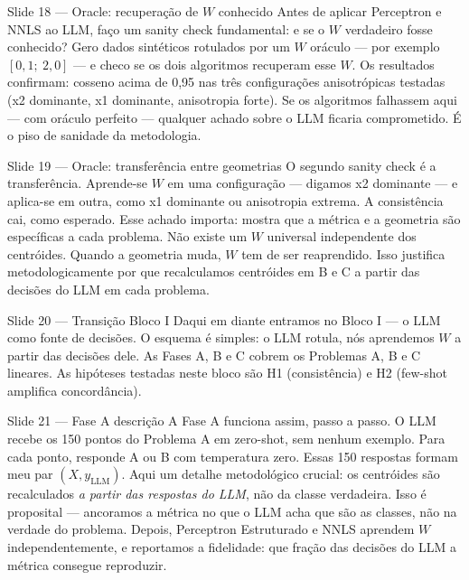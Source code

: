 \documentclass[aspectratio=169,10pt]{beamer}
\begin{document}
\begin{frame}{Slide 18 --- Oracle: recupera\c{c}\~ao de $W$ conhecido}
\footnotesize
Antes de aplicar Perceptron e NNLS ao LLM, fa\c{c}o um sanity check fundamental: e se o $W$ verdadeiro fosse conhecido? Gero dados sint\'eticos rotulados por um $W$ or\'aculo --- por exemplo $[0{,}1;\ 2{,}0]$ --- e checo se os dois algoritmos recuperam esse $W$. Os resultados confirmam: cosseno acima de 0,95 nas tr\^es configura\c{c}\~oes anisotr\'opicas testadas (x2 dominante, x1 dominante, anisotropia forte). Se os algoritmos falhassem aqui --- com or\'aculo perfeito --- qualquer achado sobre o LLM ficaria comprometido. \'E o piso de sanidade da metodologia.
\end{frame}

\begin{frame}{Slide 19 --- Oracle: transfer\^encia entre geometrias}
\footnotesize
O segundo sanity check \'e a transfer\^encia. Aprende-se $W$ em uma configura\c{c}\~ao --- digamos x2 dominante --- e aplica-se em outra, como x1 dominante ou anisotropia extrema. A consist\^encia cai, como esperado. Esse achado importa: mostra que a m\'etrica e a geometria s\~ao espec\'ificas a cada problema. N\~ao existe um $W$ universal independente dos centr\'oides. Quando a geometria muda, $W$ tem de ser reaprendido. Isso justifica metodologicamente por que recalculamos centr\'oides em B e C a partir das decis\~oes do LLM em cada problema.
\end{frame}

\begin{frame}{Slide 20 --- Transi\c{c}\~ao Bloco I}
\footnotesize
Daqui em diante entramos no Bloco I --- o LLM como fonte de decis\~oes. O esquema \'e simples: o LLM rotula, n\'os aprendemos $W$ a partir das decis\~oes dele. As Fases A, B e C cobrem os Problemas A, B e C lineares. As hip\'oteses testadas neste bloco s\~ao H1 (consist\^encia) e H2 (few-shot amplifica concord\^ancia).
\end{frame}

\begin{frame}{Slide 21 --- Fase A descri\c{c}\~ao}
\footnotesize
A Fase A funciona assim, passo a passo. O LLM recebe os 150 pontos do Problema A em zero-shot, sem nenhum exemplo. Para cada ponto, responde A ou B com temperatura zero. Essas 150 respostas formam meu par $(X, y_{\text{LLM}})$. Aqui um detalhe metodol\'ogico crucial: os centr\'oides s\~ao recalculados \emph{a partir das respostas do LLM}, n\~ao da classe verdadeira. Isso \'e proposital --- ancoramos a m\'etrica no que o LLM acha que s\~ao as classes, n\~ao na verdade do problema. Depois, Perceptron Estruturado e NNLS aprendem $W$ independentemente, e reportamos a fidelidade: que fra\c{c}\~ao das decis\~oes do LLM a m\'etrica consegue reproduzir.
\end{frame}
\end{document}
